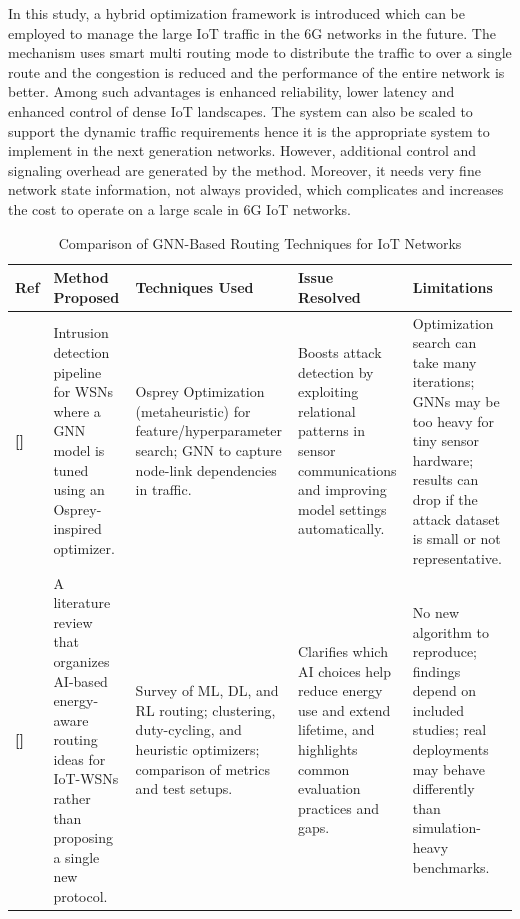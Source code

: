 \documentclass[a4paper,fleqn]{cas-dc}
\numberwithin{equation}{section}
\begin{document}
In this study,\cite{Logeshwaran2024} a hybrid optimization framework is introduced which can be employed to manage the large IoT traffic in the 6G networks in the future. The mechanism uses smart multi routing mode to distribute the traffic to over a single route and the congestion is reduced and the performance of the entire network is better. Among such advantages is enhanced reliability, lower latency and enhanced control of dense IoT landscapes. The system can also be scaled to support the dynamic traffic requirements hence it is the appropriate system to implement in the next generation networks. However, additional control and signaling overhead are generated by the method. Moreover, it needs very fine network state information, not always provided, which complicates and increases the cost to operate on a large scale in 6G IoT networks.
\begin{table}[t]
\centering
\caption{Comparison of GNN-Based Routing Techniques for IoT Networks}
\renewcommand{\arraystretch}{1.25}
\setlength{\tabcolsep}{5pt}
\begin{tabular}{|p{}|p{}|p{}|p{}|p{}|}
\hline
\textbf{Ref} & \textbf{Method Proposed} & \textbf{Techniques Used} & \textbf{Issue Resolved} & \textbf{Limitations} \\
\hline

\textbf{[\cite{Mohan2025}]} &
Intrusion detection pipeline for WSNs where a GNN model is tuned using an Osprey-inspired optimizer. &
Osprey Optimization (metaheuristic) for feature/hyperparameter search; GNN to capture node-link dependencies in traffic. &
Boosts attack detection by exploiting relational patterns in sensor communications and improving model settings automatically. &
Optimization search can take many iterations; GNNs may be too heavy for tiny sensor hardware; results can drop if the attack dataset is small or not representative. \\
\hline

\textbf{[\cite{Thakur2025}]} &
A literature review that organizes AI-based energy-aware routing ideas for IoT-WSNs rather than proposing a single new protocol. &
Survey of ML, DL, and RL routing; clustering, duty-cycling, and heuristic optimizers; comparison of metrics and test setups. &
Clarifies which AI choices help reduce energy use and extend lifetime, and highlights common evaluation practices and gaps. &
No new algorithm to reproduce; findings depend on included studies; real deployments may behave differently than simulation-heavy benchmarks. \\
\hline


\end{tabular}
\end{table}
\end{document}
